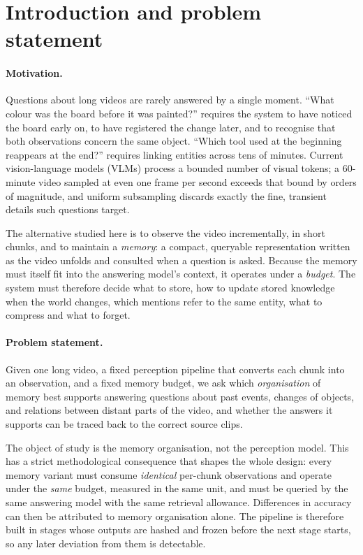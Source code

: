 \section{Introduction and problem statement}\label{sec:intro}

\paragraph{Motivation.}
Questions about long videos are rarely answered by a single moment. ``What
colour was the board before it was painted?'' requires the system to have
noticed the board early on, to have registered the change later, and to
recognise that both observations concern the same object. ``Which tool used at
the beginning reappears at the end?'' requires linking entities across tens of
minutes. Current vision-language models (VLMs) process a bounded number of
visual tokens; a 60-minute video sampled at even one frame per second exceeds
that bound by orders of magnitude, and uniform subsampling discards exactly the
fine, transient details such questions target.

The alternative studied here is to observe the video incrementally, in short
chunks, and to maintain a \emph{memory}: a compact, queryable representation
written as the video unfolds and consulted when a question is asked. Because
the memory must itself fit into the answering model's context, it operates
under a \emph{budget}. The system must therefore decide what to store, how to
update stored knowledge when the world changes, which mentions refer to the
same entity, what to compress and what to forget.

\paragraph{Problem statement.}
Given one long video, a fixed perception pipeline that converts each chunk into
an observation, and a fixed memory budget, we ask which \emph{organisation} of
memory best supports answering questions about past events, changes of
objects, and relations between distant parts of the video, and whether the
answers it supports can be traced back to the correct source clips.

The object of study is the memory organisation, not the perception model. This
has a strict methodological consequence that shapes the whole design: every
memory variant must consume \emph{identical} per-chunk observations and operate
under the \emph{same} budget, measured in the same unit, and must be queried by
the same answering model with the same retrieval allowance. Differences in
accuracy can then be attributed to memory organisation alone. The pipeline is
therefore built in stages whose outputs are hashed and frozen before the next
stage starts, so any later deviation from them is detectable.

